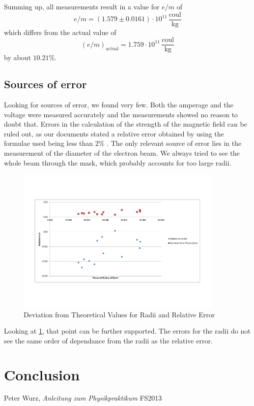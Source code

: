 \documentclass{scrreprt}
\newcommand{\unit}[1]{\ensuremath{\, \mathrm{#1}}}
\begin{document}
Summing up, all measurements result in a value for $e/m$ of
\begin{equation}
e/m = \left( 1.579 \pm 0.0161 \right)\cdot 10^{11} \unit{\frac{coul}{kg}}
\end{equation}
which differs from the actual value of 
\begin{equation}
(e/m)_{\text{actual}} = 1.759 \cdot 10^{11} \unit{\frac{coul}{kg}}
\end{equation}
by about $10.21\%$.

\subsection{Sources of error}
\label{sec:error}
Looking for sources of error, we found very few. Both the amperage and the voltage were measured accurately and the measurements showed no reason to doubt that. Errors in the calculation of the strength of the magnetic field can be ruled out, as our documents stated a relative error obtained by using the formulae used being less than $2\%$ \cite[p. 174]{physcript13}. 
The only relevant source of error lies in the measurement of the diameter of the electron beam. We always tried to see the whole beam through the mask, which probably accounts for too large radii. 
\begin{figure}[H]
	\centering
  \includegraphics[width=0.9\textwidth]{diag/errors.pdf}
	\caption{Deviation from Theoretical Values for Radii and Relative Error}
	\label{fig:error}
\end{figure}

Looking at \ref{fig:error}, that point can be further supported. The errors for the radii do not see the same order of dependance from the radii as the relative error.

\section{Conclusion}

\begin{thebibliography}{9}

  Peter Wurz,
  \emph{Anleitung zum Physikpraktikum}
  FS2013

\end{thebibliography}
\end{document}
